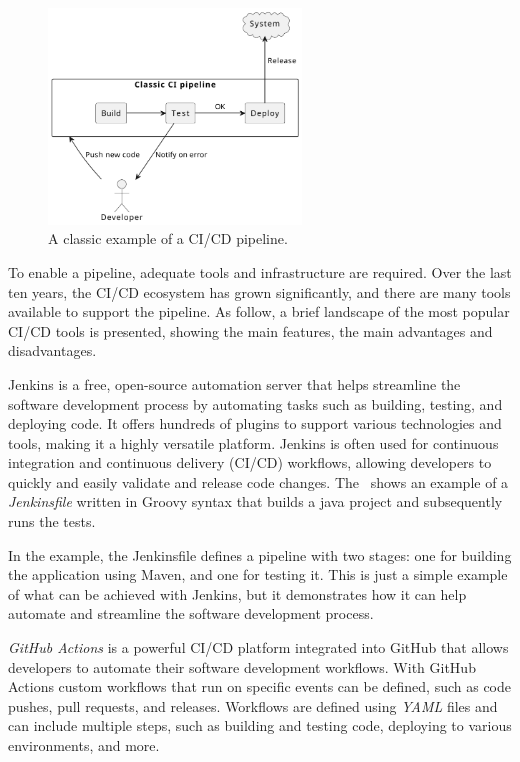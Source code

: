 \begin{figure}
	\centering
	\includegraphics[width=0.6\textwidth]{figures/cicd-example.pdf}
	\caption{A classic example of a CI/CD pipeline.}
	\label{fig:ci-cd}
\end{figure}

To enable a pipeline, adequate tools and infrastructure are required. Over the last ten years, the CI/CD ecosystem has grown significantly,
and there are many tools available to support the pipeline.
As follow, a brief landscape of the most popular CI/CD tools is presented, showing the main features, the main advantages and disadvantages.

Jenkins is a free, open-source automation server that helps streamline the software development process by automating tasks such as building,
testing, and deploying code. It offers hundreds of plugins to support various technologies and tools, making it a highly versatile platform. Jenkins
is often used for continuous integration and continuous delivery (CI/CD) workflows, allowing developers to quickly and easily validate and release
code changes. The~ shows an example of a \emph{Jenkinsfile} written in Groovy syntax that builds a java project and
subsequently runs the tests.

In the example, the Jenkinsfile defines a pipeline with two stages: one for building the application using Maven, and one for testing it. This is
just a simple example of what can be achieved with Jenkins, but it demonstrates how it can help automate and streamline the software development
process.



\emph{GitHub Actions} is a powerful CI/CD platform integrated into GitHub that allows developers to automate their software development workflows.
With GitHub Actions custom workflows that run on specific events can be defined, such as code pushes, pull requests, and releases. Workflows are
defined using \emph{YAML} files and can include multiple steps, such as building and testing code, deploying to various environments, and more.

